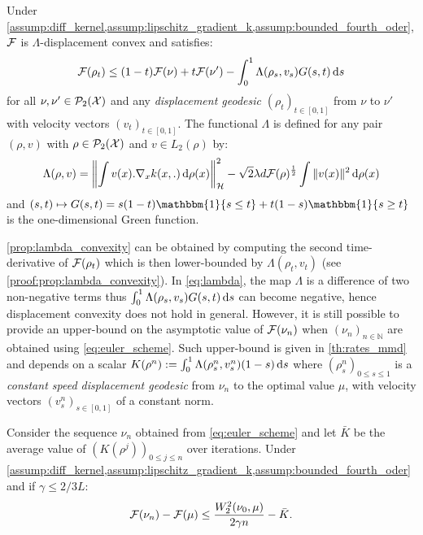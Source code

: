\begin{proposition}
	\label{prop:lambda_convexity} Under \cref{assump:diff_kernel,assump:lipschitz_gradient_k,assump:bounded_fourth_oder}, ${{\mathcal F}}$ is $\Lambda$-displacement convex and satisfies:
		\begin{equation}
	{{\mathcal F}}(\rho_{t})\leq(1-t){{\mathcal F}}(\nu)+t{{\mathcal F}}(\nu')-\int_0^1 \Lambda(\rho_s, v_s ) G(s,t)\mathop{}\!\mathrm{d} s
	\end{equation}
for all $\nu, \nu'\in \mathcal{P}_2({{\mathcal X}})$ and any \textit{displacement geodesic} $(\rho_t)_{t\in[0,1]}$ from $\nu$ to $\nu'$ with velocity vectors $(v_t)_{t \in[0,1]}$. The functional $\Lambda$ is defined for any pair $(\rho,v)$ with $\rho\in \mathcal{P}_2({{\mathcal X}})$ and $v\in L_2(\rho)$  by:
	\begin{align}\label{eq:lambda}
		\Lambda(\rho,v) = \left\Vert \int v(x).\nabla_x k(x,.) \mathop{}\!\mathrm{d} \rho(x) \right\Vert^2_{\mathcal{H}} - \sqrt{2}\lambda d {{\mathcal F}}(\rho)^{\frac{1}{2}}  \int \Vert  v(x) \Vert^2 \mathop{}\!\mathrm{d} \rho(x) 
	\end{align}
and $(s,t)\mapsto G(s,t)=  s(1-t) \mathbbm{1}\{s\leq t\}+ t(1-s) \mathbbm{1}\{s\geq t\}$	is the one-dimensional Green function.
	\end{proposition}
\cref{prop:lambda_convexity} can be obtained by computing the second time-derivative of ${{\mathcal F}}(\rho_t)$ which is then lower-bounded by $\Lambda(\rho_t,v_t)$ (see \cref{proof:prop:lambda_convexity}).
In \cref{eq:lambda}, the map $\Lambda$ is a difference of two non-negative terms thus $\int_0^1 \Lambda(\rho_s, v_s ) G(s,t)\mathop{}\!\mathrm{d} s$ can become negative, hence displacement convexity does not hold in general. However, it is still possible to provide an upper-bound on the asymptotic value of ${{\mathcal F}}(\nu_n)$ when $(\nu_n)_{n \in \mathbb{N}}$ are obtained using \cref{eq:euler_scheme}. Such upper-bound is given in \cref{th:rates_mmd} and depends on a scalar $ K(\rho^n) :=  \int_0^1\Lambda(\rho_s^n,v_s^n)(1-s)\mathop{}\!\mathrm{d} s$ where $(\rho_s^n)_{0\leq s\leq 1}$ is a \textit{constant speed displacement geodesic} from $\nu_n$ to the optimal value $\mu$, with velocity vectors $(v_s^n)_{s \in [0,1]}$ of a constant norm.  
\begin{theorem}\label{th:rates_mmd}
	Consider the sequence $\nu_n$ obtained from \cref{eq:euler_scheme} and let $\bar{K}$ be the average value of $(K(\rho^j))_{0\leq j \leq n}$ over iterations.  Under \cref{assump:diff_kernel,assump:lipschitz_gradient_k,assump:bounded_fourth_oder} and if $\gamma \leq 2/3L$:%
\begin{align}
{{\mathcal F}}(\nu_n) - {{\mathcal F}}(\mu)\leq  \frac{W_2^2(\nu_0,\mu)}{2 \gamma n} -\bar{K}.
\end{align}
\end{theorem}
